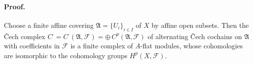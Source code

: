 \paragraph{Proof.}
Choose a finite affine covering $\mathfrak{A} = \{U_i\}_{i \in I}$ of $X$ by
affine open subsets. Then the \v{C}ech complex
$C^{\cdot} = C^{\cdot}(\mathfrak{A}, \mathcal{F})
  = \oplus\, C^p(\mathfrak{A}, \mathcal{F})$
of alternating \v{C}ech cochains on $\mathfrak{A}$ with coefficients in
$\mathcal{F}$ is a finite complex of $A$-flat modules, whose cohomologies are
isomorphic to the cohomology groups $H^p(X, \mathcal{F})$.
